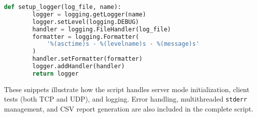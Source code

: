 \begin{lstlisting}[language=Python, caption={Excerpt for logging setup.}]
    def setup_logger(log_file, name):
        logger = logging.getLogger(name)
        logger.setLevel(logging.DEBUG)
        handler = logging.FileHandler(log_file)
        formatter = logging.Formatter(
            '%(asctime)s - %(levelname)s - %(message)s'
        )
        handler.setFormatter(formatter)
        logger.addHandler(handler)
        return logger
\end{lstlisting}

These snippets illustrate how the script handles server mode initialization, client tests (both TCP and UDP), and logging. Error handling, multithreaded \texttt{stderr} management, and CSV report generation are also included in the complete script.